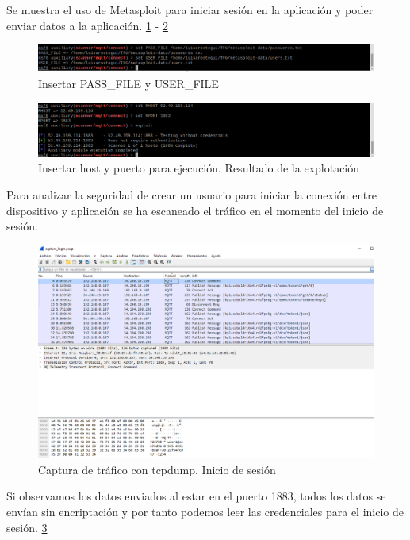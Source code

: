 Se muestra el uso de Metasploit para iniciar sesión en la aplicación y poder enviar datos a la aplicación. \ref{fig:figure22-prueba} - \ref{fig:figure22.2-prueba} \\

\begin{figure}[p]
    \centering
    \includegraphics[width=\linewidth]{imagenes/2022-06-14-180947_1920x1080_scrot.png}
    \caption{Insertar PASS\_FILE y USER\_FILE}
    \label{fig:figure22-prueba}
\end{figure}

\begin{figure}[p]
    \centering
    \includegraphics[width=\linewidth]{imagenes/2022-06-14-183011_1920x1080_scrot.png}
    \caption{Insertar host y puerto para ejecución. Resultado de la explotación}
    \label{fig:figure22.2-prueba}
\end{figure}

Para analizar la seguridad de crear un usuario para iniciar la conexión entre dispositivo y aplicación se ha escaneado el tráfico en el momento del inicio de sesión. \\

\begin{figure}[p]
    \centering
    \includegraphics[width=\linewidth]{imagenes/Captura de pantalla 2022-06-26 190942.png}
    \caption{Captura de tráfico con tcpdump. Inicio de sesión}
    \label{fig:figure23-prueba}
\end{figure}

Si observamos los datos enviados al estar en el puerto 1883, todos los datos se envían sin encriptación y por tanto podemos leer las credenciales para el inicio de sesión. \ref{fig:figure23-prueba}